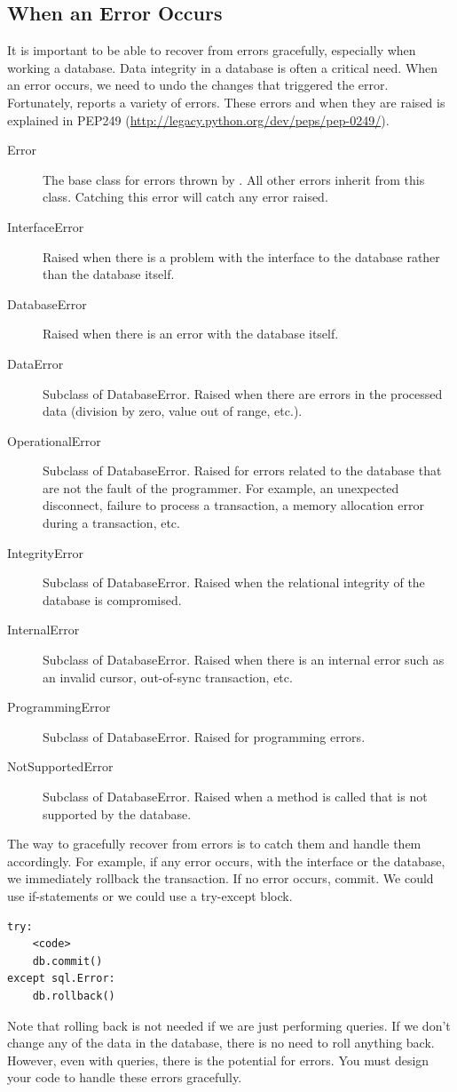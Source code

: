 \subsection*{When an Error Occurs}
It is important to be able to recover from errors gracefully, especially when working a database.
Data integrity in a database is often a critical need.
When an error occurs, we need to undo the changes that triggered the error.
Fortunately,  reports a variety of errors.
These errors and when they are raised is explained in PEP249 (\url{http://legacy.python.org/dev/peps/pep-0249/}).
\begin{description}
\item[Error] The base class for errors thrown by .  All other errors inherit from this class.  Catching this error will catch any error raised.
\item[InterfaceError] Raised when there is a problem with the interface to the database rather than the database itself.
\item[DatabaseError] Raised when there is an error with the database itself.
\item[DataError] Subclass of DatabaseError.  Raised when there are errors in the processed data (division by zero, value out of range, etc.).
\item[OperationalError] Subclass of DatabaseError. Raised for errors related to the database that are not the fault of the programmer.  For example, an unexpected disconnect, failure to process a transaction, a memory allocation error during a transaction, etc.
\item[IntegrityError] Subclass of DatabaseError.  Raised when the relational integrity of the database is compromised.
\item[InternalError] Subclass of DatabaseError. Raised when there is an internal error such as an invalid cursor, out-of-sync transaction, etc.
\item[ProgrammingError] Subclass of DatabaseError.  Raised for programming errors.
\item[NotSupportedError] Subclass of DatabaseError.  Raised when a method is called that is not supported by the database.
\end{description}

The way to gracefully recover from errors is to catch them and handle them accordingly.  For example, if any error occurs, with the interface or the database, we immediately rollback the transaction.  If no error occurs, commit.  We could use if-statements or we could use a try-except block.
\begin{lstlisting}
try:
    <code>
    db.commit()
except sql.Error:
    db.rollback()
\end{lstlisting}
Note that rolling back is not needed if we are just performing queries.
If we don't change any of the data in the database, there is no need to roll anything back.  However, even with queries, there is the potential for errors.  You must design your code to handle these errors gracefully.

\let\undefined\lsql 